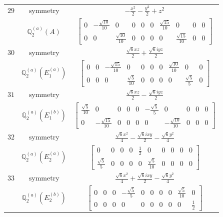 \documentclass[fleqn,8pt,landscape]{jsarticle}
\begin{document}
\begin{longtable}{ccc}
$ 29 $ & $ \text{symmetry} $ & $ - \frac{x^{2}}{2} - \frac{y^{2}}{2} + z^{2} $ \\
$  $ & $ \mathbb{Q}_{2}^{(a)}(A) $ & $ \begin{bmatrix} 0 & - \frac{\sqrt{10}}{10} & 0 & 0 & 0 & 0 & \frac{\sqrt{15}}{10} & 0 & 0 & 0 \\ 0 & 0 & \frac{\sqrt{10}}{10} & 0 & 0 & 0 & 0 & \frac{\sqrt{15}}{10} & 0 & 0 \end{bmatrix} $ \\ \hline
$ 30 $ & $ \text{symmetry} $ & $ \frac{\sqrt{6} x z}{2} + \frac{\sqrt{6} i y z}{2} $ \\
$  $ & $ \mathbb{Q}_{2}^{(a)}(E_{1}^{(a)}) $ & $ \begin{bmatrix} 0 & 0 & - \frac{\sqrt{15}}{10} & 0 & 0 & 0 & 0 & \frac{\sqrt{10}}{10} & 0 & 0 \\ 0 & 0 & 0 & \frac{\sqrt{5}}{10} & 0 & 0 & 0 & 0 & \frac{\sqrt{5}}{5} & 0 \end{bmatrix} $ \\ \hline
$ 31 $ & $ \text{symmetry} $ & $ \frac{\sqrt{6} x z}{2} - \frac{\sqrt{6} i y z}{2} $ \\
$  $ & $ \mathbb{Q}_{2}^{(a)}(E_{1}^{(b)}) $ & $ \begin{bmatrix} \frac{\sqrt{5}}{10} & 0 & 0 & 0 & 0 & - \frac{\sqrt{5}}{5} & 0 & 0 & 0 & 0 \\ 0 & - \frac{\sqrt{15}}{10} & 0 & 0 & 0 & 0 & - \frac{\sqrt{10}}{10} & 0 & 0 & 0 \end{bmatrix} $ \\ \hline
$ 32 $ & $ \text{symmetry} $ & $ \frac{\sqrt{6} x^{2}}{4} - \frac{\sqrt{6} i x y}{2} - \frac{\sqrt{6} y^{2}}{4} $ \\
$  $ & $ \mathbb{Q}_{2}^{(a)}(E_{2}^{(a)}) $ & $ \begin{bmatrix} 0 & 0 & 0 & 0 & \frac{1}{2} & 0 & 0 & 0 & 0 & 0 \\ \frac{\sqrt{5}}{5} & 0 & 0 & 0 & 0 & \frac{\sqrt{5}}{10} & 0 & 0 & 0 & 0 \end{bmatrix} $ \\ \hline
$ 33 $ & $ \text{symmetry} $ & $ \frac{\sqrt{6} x^{2}}{4} + \frac{\sqrt{6} i x y}{2} - \frac{\sqrt{6} y^{2}}{4} $ \\
$  $ & $ \mathbb{Q}_{2}^{(a)}(E_{2}^{(b)}) $ & $ \begin{bmatrix} 0 & 0 & 0 & - \frac{\sqrt{5}}{5} & 0 & 0 & 0 & 0 & \frac{\sqrt{5}}{10} & 0 \\ 0 & 0 & 0 & 0 & 0 & 0 & 0 & 0 & 0 & \frac{1}{2} \end{bmatrix} $ \\ \hline

\end{longtable}
\end{document}
